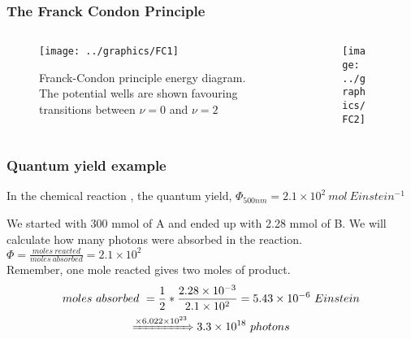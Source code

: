 \documentclass[a4paper,12pt,titlepage]{article}
\begin{document}
\begin{frame}[shrink,label=FranckCondonL2]
\frametitle{The Franck Condon Principle}
\begin{columns}[onlytextwidth]
\begin{column}{.3\linewidth}
\begin{figure}[h!]
\texttt{[image: ../graphics/FC1]}
\caption{\footnotesize Franck-Condon principle energy diagram. The potential wells are shown favouring transitions between \(\nu = 0\) and \(\nu = 2\)}
\end{figure}
\end{column}
\begin{column}{.7\linewidth}
\begin{figure}[h!]
\texttt{[image: ../graphics/FC2]}
\end{figure}
\end{column}
\hyperlink{FranckCondonL4<5>}{}
\end{columns}
\end{frame}

\begin{frame}
\frametitle{Quantum yield example}
\begin{example}
In the chemical reaction , the quantum yield, \(\Phi_{500nm} = 2.1\times 10^2\ mol\ Einstein^{-1}\)\\\hspace{3pt}

We started with 300 mmol of A and ended up with 2.28 mmol of B. We will calculate how many photons were absorbed in the reaction.\\
\medskip \(\Phi = \frac{moles\ reacted}{moles\ absorbed} = 2.1\times 10^2\)\\
Remember, one mole reacted gives two moles of product.\\
\medskip \begin{multline*}moles\ absorbed\ = \frac{1}{2} *\frac{2.28\times 10^{-3}}{2.1\times 10^2} = 5.43\times 10^{-6}\ Einstein\\ \xRightarrow{\times 6.022\times10^{23}} 3.3\times 10^{18}\ photons\end{multline*}
\end{example}
\end{frame}
\end{document}
